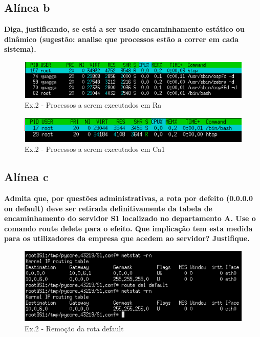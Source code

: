 \documentclass[a4paper]{report}
\begin{document}
\subsection{Alínea b}
\textbf{Diga, justificando, se está a ser usado encaminhamento estático ou
dinâmico (sugestão: analise que processos estão a correr em cada sistema).}

\begin{figure}[H]
    \centering 
    \includegraphics[width=\textwidth]{images/htop2a.png}
    \caption{Ex.2 - Processos a serem executados em Ra}
    \label{fig:htop2a}
\end{figure}

\begin{figure}[H]
    \centering 
    \includegraphics[width=\textwidth]{images/htopca1.png}
    \caption{Ex.2 - Processos a serem executados em Ca1}
    \label{fig:htopca1}
\end{figure}

\subsection{Alínea c}
\textbf{Admita que, por questões administrativas, a rota por defeito (0.0.0.0 ou
default) deve ser retirada definitivamente da tabela de encaminhamento do
servidor S1 localizado no departamento A. Use o comando route delete para o
efeito. Que implicação tem esta medida para os utilizadores da empresa que
acedem ao servidor? Justifique.}

\begin{figure}[H]
    \centering 
    \includegraphics[width=\textwidth]{images/routeDelete.png}
    \caption{Ex.2 - Remoção da rota default}
    \label{fig:routeDelete}
\end{figure}
\end{document}
